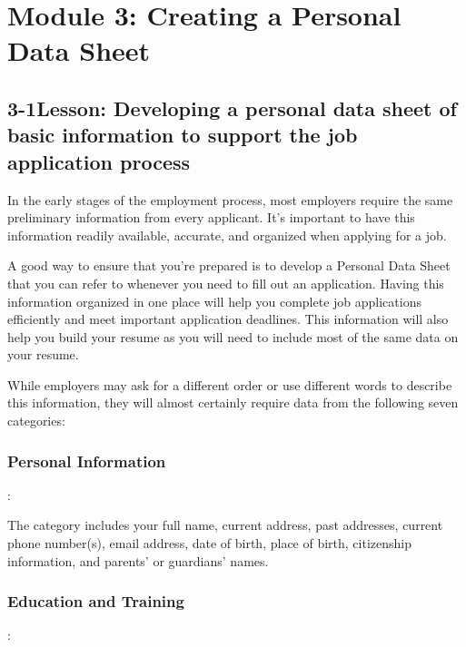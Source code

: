 \pagebreak \section*{Module 3:	Creating a Personal Data Sheet}
\noindent\makebox[\textwidth]{\rule{\linewidth}{0.4pt}}  \localtableofcontents
\noindent\makebox[\textwidth]{\rule{\linewidth}{0.4pt}}


\pagebreak \subsection*{3-1\quad Lesson: Developing a personal data sheet of basic information to support the job application process}
In the early stages of the employment process, most employers require the same preliminary information from every applicant. It's important to have this information readily available, accurate, and organized when applying for a job.

A good way to ensure that you're prepared is to develop a Personal Data Sheet that you can refer to whenever you need to fill out an application. Having this information organized in one place will help you complete job applications efficiently and meet important application deadlines. This information will also help you build your resume as you will need to include most of the same data on your resume.

While employers may ask for a different order or use different words to describe this information, they will almost certainly require data from the following seven categories:

\subsubsection*{Personal Information}:

The category includes your full name, current address, past addresses, current phone number(s), email address, date of birth, place of birth, citizenship information, and parents' or guardians' names.

\subsubsection*{Education and Training}:

